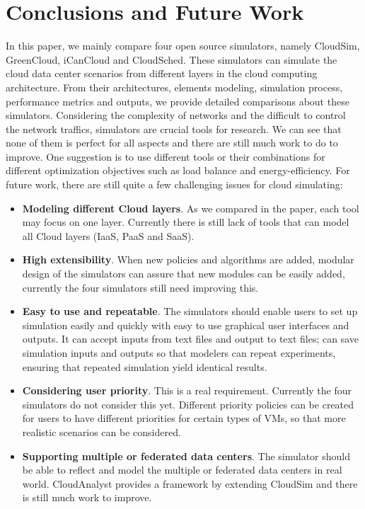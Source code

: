 \documentclass[3p, twocolumn]{elsarticle}
\begin{document}
\section{Conclusions and Future Work}
In this paper, we mainly compare four open source simulators, namely CloudSim, GreenCloud, iCanCloud and CloudSched. These simulators can simulate the cloud data center scenarios from different layers in the cloud computing architecture. From their architectures, elements modeling, simulation process, performance metrics and outputs, we provide detailed comparisons about these simulators. Considering the complexity of networks and the difficult to control the network traffics, simulators are crucial tools for research. We can see that none of them is perfect for all aspects and there are still much work to do to improve. One suggestion is to use different tools or their combinations for different optimization objectives such as load balance and energy-efficiency.  For future work, there are still quite a few challenging issues for cloud simulating:
\begin{itemize}
\item
\textbf{Modeling different Cloud layers}. As we compared in the paper, each tool may focus on one layer. Currently there is still lack of tools that can model all Cloud layers (IaaS, PaaS and SaaS).
\item
\textbf{High extensibility}. When new policies and algorithms are added, modular design of the simulators can assure that new modules can be easily added, currently the four simulators still need improving this.
\item
\textbf{Easy to use and repeatable}. The simulators should enable users to set up simulation easily and quickly with easy to use graphical user interfaces and outputs. It can accept inputs from text files and output to text files; can save simulation inputs and outputs so that modelers can repeat experiments, ensuring that repeated simulation yield identical results.
\item
\textbf{Considering user priority}. This is a  real requirement. Currently the four simulators do not consider this yet. Different priority policies can be created for users to have different priorities for certain types of VMs, so that more realistic scenarios  can be considered.
\item
\textbf{Supporting multiple or federated data centers}. The simulator should be able to reflect and model the multiple or federated data centers in real world. CloudAnalyst provides a framework by extending CloudSim and there is still much work to improve.
\end{itemize}
\end{document}
